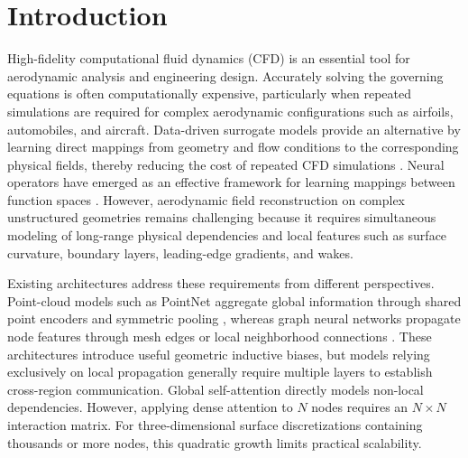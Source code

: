 \documentclass[a4paper,fleqn]{cas-sc}
\begin{document}
\maketitle

\section{Introduction}
\label{sec:introduction}

High-fidelity computational fluid dynamics (CFD) is an essential tool for aerodynamic analysis and engineering design. Accurately solving the governing equations is often computationally expensive, particularly when repeated simulations are required for complex aerodynamic configurations such as airfoils, automobiles, and aircraft. Data-driven surrogate models provide an alternative by learning direct mappings from geometry and flow conditions to the corresponding physical fields, thereby reducing the cost of repeated CFD simulations \citep{ref04,ref05}. Neural operators have emerged as an effective framework for learning mappings between function spaces \citep{ref07,ref08}. However, aerodynamic field reconstruction on complex unstructured geometries remains challenging because it requires simultaneous modeling of long-range physical dependencies and local features such as surface curvature, boundary layers, leading-edge gradients, and wakes.

Existing architectures address these requirements from different perspectives. Point-cloud models such as PointNet aggregate global information through shared point encoders and symmetric pooling \citep{ref11}, whereas graph neural networks propagate node features through mesh edges or local neighborhood connections \citep{ref12,ref14}. These architectures introduce useful geometric inductive biases, but models relying exclusively on local propagation generally require multiple layers to establish cross-region communication. Global self-attention directly models non-local dependencies. However, applying dense attention to $N$ nodes requires an $N\times N$ interaction matrix. For three-dimensional surface discretizations containing thousands or more nodes, this quadratic growth limits practical scalability.
\end{document}
